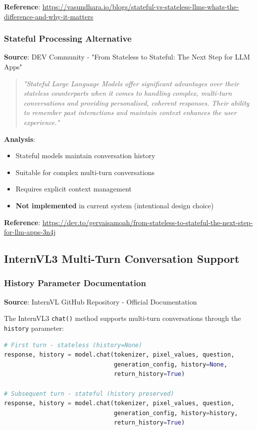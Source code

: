 \documentclass[11pt,a4paper]{article}
\begin{document}
\textbf{Reference}: \url{https://vasundhara.io/blogs/stateful-vs-stateless-llms-whats-the-difference-and-why-it-matters}

\subsubsection{Stateful Processing Alternative}

\textbf{Source}: DEV Community - "From Stateless to Stateful: The Next Step for LLM Apps"

\begin{quote}
\textit{"Stateful Large Language Models offer significant advantages over their stateless counterparts when it comes to handling complex, multi-turn conversations and providing personalised, coherent responses. Their ability to remember past interactions and maintain context enhances the user experience."}
\end{quote}

\textbf{Analysis}:
\begin{itemize}[leftmargin=*]
    \item Stateful models maintain conversation history
    \item Suitable for complex multi-turn conversations
    \item Requires explicit context management
    \item \textbf{Not implemented} in current system (intentional design choice)
\end{itemize}

\textbf{Reference}: \url{https://dev.to/gervaisamoah/from-stateless-to-stateful-the-next-step-for-llm-apps-3n4j}

\subsection{InternVL3 Multi-Turn Conversation Support}

\subsubsection{History Parameter Documentation}

\textbf{Source}: InternVL GitHub Repository - Official Documentation

The InternVL3 \texttt{chat()} method supports multi-turn conversations through the \texttt{history} parameter:

\begin{lstlisting}[language=Python]
# First turn - stateless (history=None)
response, history = model.chat(tokenizer, pixel_values, question,
                               generation_config, history=None,
                               return_history=True)

# Subsequent turn - stateful (history preserved)
response, history = model.chat(tokenizer, pixel_values, question,
                               generation_config, history=history,
                               return_history=True)
\end{lstlisting}
\end{document}
